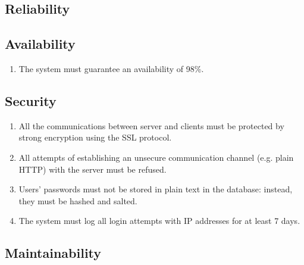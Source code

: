 
\subsection{Reliability}

\subsection{Availability}
\begin{enumerate}
\item The system must guarantee an availability of 98\%.
\end{enumerate}

\subsection{Security}

\begin{enumerate}
\item All the communications between server and clients must be protected by strong encryption using the SSL protocol.
\item All attempts of establishing an unsecure communication channel (e.g. plain HTTP) with the server must be refused.
\item Users' passwords must not be stored in plain text in the database: instead, they must be hashed and salted.
\item The system must log all login attempts with IP addresses for at least 7 days.
\end{enumerate}

\subsection{Maintainability}

